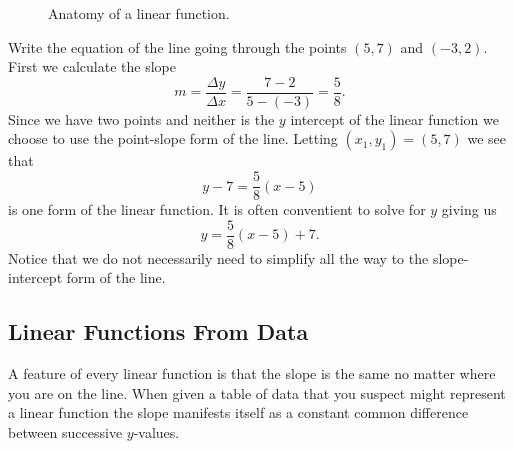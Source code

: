 \begin{figure}[ht!]
    \centering
    \caption{Anatomy of a linear function.}
    \label{fig:0.1.linear_fn}
\end{figure}




\bex
Write the equation of the line going through the points $(5,7)$ and $(-3,2)$.
\eex
First we calculate the slope 
\[ m = \frac{\Delta y}{\Delta x} = \frac{7 - 2}{5-(-3)} = \frac{5}{8}. \]
Since we have two points and neither is the $y$ intercept of the linear function we choose
to use the point-slope form of the line.  Letting $(x_1,y_1) = (5,7)$ we see that
\[ y - 7 = \frac{5}{8} \left( x-5 \right) \]
is one form of the linear function.  
It is often conventient to solve for $y$ giving us
\[ y = \frac{5}{8} \left( x-5 \right) + 7. \]
Notice that we do not necessarily need to simplify all the way to the slope-intercept form
of the line.  
\afterex

\subsection*{Linear Functions From Data}
A feature of every linear function is that the slope is the same no matter where you are
on the line.  When given a table of data that you suspect might represent a linear
function the slope manifests itself as a constant common difference between successive
$y$-values.  

